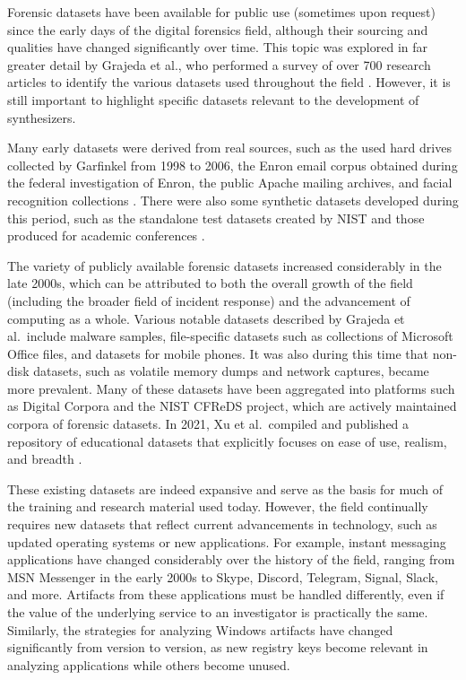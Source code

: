 \documentclass[preprint,12pt]{elsarticle}
\begin{document}
Forensic datasets have been available for public use (sometimes upon
request) since the early days of the digital forensics field, although
their sourcing and qualities have changed significantly over time. This
topic was explored in far greater detail by Grajeda et al., who
performed a survey of over 700 research articles to identify the various
datasets used throughout the field
\citep{grajedaAvailabilityDatasetsDigital2017}. However, it is still
important to highlight specific datasets relevant to the development of
synthesizers.

Many early datasets were derived from real sources, such as the used
hard drives collected by Garfinkel from 1998 to 2006, the Enron email
corpus obtained during the federal investigation of Enron, the public
Apache mailing archives, and facial recognition collections
\citep{garfinkelForensicCorporaChallenge2007,grajedaAvailabilityDatasetsDigital2017,yannikosDataCorporaDigital2014,ricanekMORPHLongitudinalImage2006}.
There were also some synthetic datasets developed during this period,
such as the standalone test datasets created by NIST and those produced
for academic conferences \citep{woodsCreatingRealisticCorpora2011}.

The variety of publicly available forensic datasets increased
considerably in the late 2000s, which can be attributed to both the
overall growth of the field (including the broader field of incident
response) and the advancement of computing as a whole. Various notable
datasets described by Grajeda et al.~include malware samples,
file-specific datasets such as collections of Microsoft Office files,
and datasets for mobile phones. It was also during this time that
non-disk datasets, such as volatile memory dumps and network captures,
became more prevalent. Many of these datasets have been aggregated into
platforms such as Digital Corpora
\citep{garfinkelBringingScienceDigital2009,yannikosDataCorporaDigital2014}
and the NIST CFReDS project, which are actively maintained corpora of
forensic datasets. In 2021, Xu et al.~compiled and published a
repository of educational datasets that explicitly focuses on ease of
use, realism, and breadth \citep{xuDesigningSharedDigital2022}.

These existing datasets are indeed expansive and serve as the basis for
much of the training and research material used today. However, the
field continually requires new datasets that reflect current
advancements in technology, such as updated operating systems or new
applications. For example, instant messaging applications have changed
considerably over the history of the field, ranging from MSN Messenger
in the early 2000s to Skype, Discord, Telegram, Signal, Slack, and more.
Artifacts from these applications must be handled differently, even if
the value of the underlying service to an investigator is practically
the same. Similarly, the strategies for analyzing Windows artifacts have
changed significantly from version to version, as new registry keys
become relevant in analyzing applications while others become unused.
\end{document}
